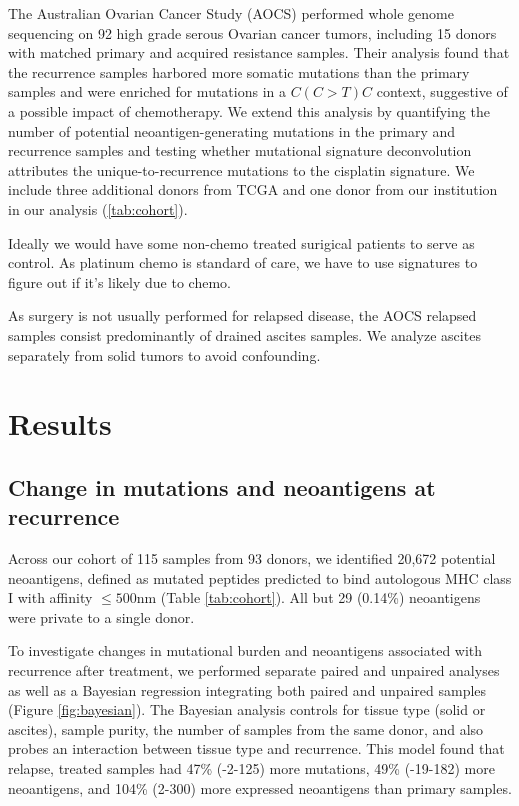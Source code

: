The Australian Ovarian Cancer Study (AOCS)\cite{Patch_2015} performed whole genome sequencing on 92 high grade serous Ovarian cancer tumors, including 15 donors with matched primary and acquired resistance samples. Their analysis found that the recurrence samples harbored more somatic mutations than the primary samples and were enriched for mutations in a $C(C \gt T)C$ context, suggestive of a possible impact of chemotherapy. We extend this analysis by quantifying the number of potential neoantigen-generating mutations in the primary and recurrence samples and testing whether mutational signature deconvolution attributes the unique-to-recurrence mutations to the  cisplatin signature. We include three additional donors from TCGA and one donor from our institution in our analysis (\ref{tab:cohort}).

Ideally we would have some non-chemo treated surigical patients to serve as control. As platinum chemo is standard of care, we have to use signatures to figure out if it's likely due to chemo.

As surgery is not usually performed for relapsed disease, the AOCS relapsed samples consist predominantly of drained ascites samples. We analyze ascites separately from solid tumors to avoid confounding.

\section*{Results}

\subsection*{Change in mutations and neoantigens at recurrence}
Across our cohort of 115 samples from 93 donors, we identified 20,672 potential neoantigens, defined as mutated peptides predicted to bind autologous MHC class I with affinity $\leq 500$nm (Table \ref{tab:cohort}). All but 29 (0.14\%) neoantigens were private to a single donor.

To investigate changes in mutational burden and neoantigens associated with recurrence after treatment, we performed separate paired and unpaired analyses as well as a Bayesian regression integrating both paired and unpaired samples (Figure \ref{fig:bayesian}). The Bayesian analysis controls for tissue type (solid or ascites), sample purity, the number of samples from the same donor, and also probes an interaction between tissue type and recurrence. This model found that relapse, treated samples had 47\% (-2-125) more mutations, 49\% (-19-182) more neoantigens, and 104\% (2-300) more expressed neoantigens than primary samples.

